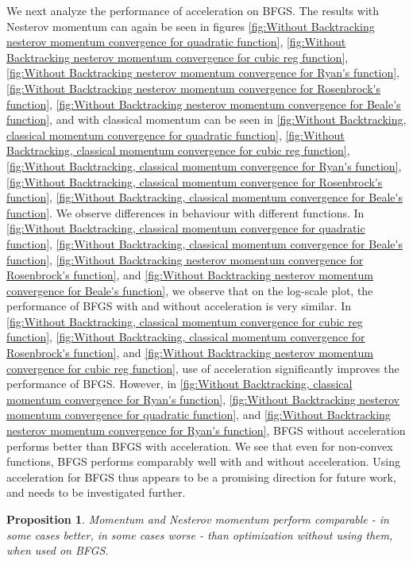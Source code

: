 \documentclass{article}
\newtheorem{prop}{Proposition}
\begin{document}
We next analyze the performance of acceleration on BFGS. The results with Nesterov momentum can again be seen in	figures \ref{fig:Without Backtracking nesterov momentum convergence for quadratic function},
\ref{fig:Without Backtracking nesterov momentum convergence for cubic reg function},
\ref{fig:Without Backtracking nesterov momentum convergence for Ryan's function},
\ref{fig:Without Backtracking nesterov momentum convergence for Rosenbrock's function},
\ref{fig:Without Backtracking nesterov momentum convergence for Beale's function}, and with classical momentum can be seen in \ref{fig:Without Backtracking, classical momentum convergence for quadratic function},
\ref{fig:Without Backtracking, classical momentum convergence for cubic reg function},
\ref{fig:Without Backtracking, classical momentum convergence for Ryan's function},
\ref{fig:Without Backtracking, classical momentum convergence for Rosenbrock's function},
\ref{fig:Without Backtracking, classical momentum convergence for Beale's function}. We observe differences in behaviour with different functions. In \ref{fig:Without Backtracking, classical momentum convergence for quadratic function}, \ref{fig:Without Backtracking, classical momentum convergence for Beale's function}, \ref{fig:Without Backtracking nesterov momentum convergence for Rosenbrock's function}, and \ref{fig:Without Backtracking nesterov momentum convergence for Beale's function}, we observe that on the log-scale plot, the performance of BFGS with and without acceleration is very similar. In \ref{fig:Without Backtracking, classical momentum convergence for cubic reg function}, \ref{fig:Without Backtracking, classical momentum convergence for Rosenbrock's function}, and \ref{fig:Without Backtracking nesterov momentum convergence for cubic reg function}, use of acceleration significantly improves the performance of BFGS. However, in \ref{fig:Without Backtracking, classical momentum convergence for Ryan's function}, \ref{fig:Without Backtracking nesterov momentum convergence for quadratic function}, and \ref{fig:Without Backtracking nesterov momentum convergence for Ryan's function}, BFGS without acceleration performs better than BFGS with acceleration. We see that even for non-convex functions, BFGS performs comparably well with and without acceleration. Using acceleration for BFGS thus appears to be a promising direction for future work, and needs to be investigated further.

\begin{prop}
	Momentum and Nesterov momentum perform comparable - in some cases better, in some cases worse - than optimization without using them, when used on BFGS.
\end{prop}
\end{document}
